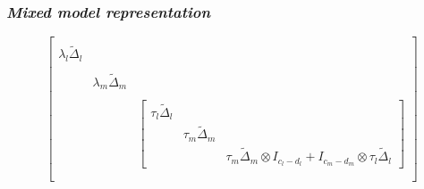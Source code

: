 \documentclass[12pt]{beamer}
\newcommand{\newmaththought}[1]{{ \color{foreground} {#1}}}
\newcommand{\mixedmodelmath}[1]{{ \color{yuppiered} {#1}}}
\newcommand{\ms}{\scriptscriptstyle}
\begin{document}
\begin{frame}
\frametitle{\emph{Mixed model representation}}

%
\begin{equation*}
\left[\begin{array}{ccc}
&&\\
\lambda_l \tilde{\Delta}_l &&\\
&&\\
&\lambda_m \tilde{\Delta}_m&\\
&&\\
&&\left[\begin{array}{ccc}
\tau_l \tilde{\Delta}_l &&\\
&\tau_m \tilde{\Delta}_m&\\
&&\tau_m \tilde{\Delta}_m \otimes I_{\ms{c_l-d_l}} +  I_{\ms{c_m-d_m}} \otimes \tau_l \tilde{\Delta}_l \end{array}\right]\\
&&\\
\end{array}\right]
\end{equation*}
%

\end{frame}
\end{document}
